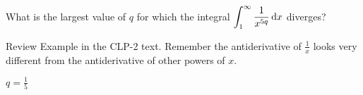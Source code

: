 
\begin{question}[2016Q4]
What is the largest value of $q$ for which the integral
$\displaystyle \int_1^\infty \frac1{x^{5q}}\,\mathrm{d}x$ diverges?
\end{question}

\begin{hint}
Review Example  in the
CLP-2 text. Remember the antiderivative of $\frac{1}{x}$ looks very different from the antiderivative of other powers of $x$.
\end{hint}

\begin{answer}
$q=\frac{1}{5}$
\end{answer}

